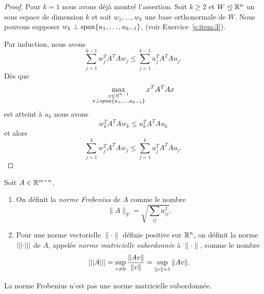 \begin{proof}
Pour $k=1$ nous avons déjà montré l'assertion. Soit $k \geq 2$ et $W \trianglelefteq \mathbb{R}^n$ un sous espace de dimension $k$ et soit $w_1,\dots,w_k$ une base orthonormale de $W$. 
Nous pouvons supposer $w_k \perp \operatorname{span}\{u_1,\dots,u_{k-1}\}$, (voir Exercice~\ref{s:item:3}). 

Par induction, nous avons 
\begin{displaymath}
  \sum_{j=1}^{k-1} w_j^TA^TAw_j \leq  \sum_{j=1}^{k-1} u_j^TA^TAu_j.
\end{displaymath}
Dès que   
\begin{displaymath}
  \max_{\substack{x \in S^{n-1} \\ x \perp \operatorname{span}\{u_1,\dots,u_{k-1}\}}} x^TA^TAx 
\end{displaymath}
est atteint à $u_k$ nous avons 
\begin{displaymath}
  w_k^TA^TAw_k \leq u_k^TA^TAu_k
\end{displaymath}
et alors
\begin{displaymath}
  \sum_{j=1}^{k} w_j^TA^TAw_j \leq  \sum_{j=1}^{k} u_j^TA^TAu_j.
\end{displaymath}

\end{proof}


\begin{definition}
  \label{def:26}
  Soit $A \in \mathbb{R}^{m \times n}$.
  \begin{enumerate}
 
  \item[1)] On définit la \emph{norme Frobenius} de $A$ comme le nombre 
  \begin{displaymath}
    \|A\|_F = \sqrt{\sum_{ij}a_{ij}^2}.
  \end{displaymath}
  
  \item[2)] Pour une norme vectorielle $\|\cdot\|$ définie positive sur $\Bbb R^n$, on définit la norme $\lvert\lvert\lvert\cdot\rvert\rvert\rvert$ de $A$, appelée \emph{norme matricielle subordonnée} à $\|\cdot\|$, comme le nombre 
   \begin{displaymath}
    	\lvert\lvert\lvert A\rvert\rvert\rvert = \sup_{v \neq 0} \frac{\|Av\|}{\|v\|} = \sup_{\|v\| = 1} \|Av\|.
  \end{displaymath}
  
   \end{enumerate}
\end{definition}

\begin{remark}
	La norme Frobenius n'est pas une norme matricielle subordonnée.
\end{remark}

